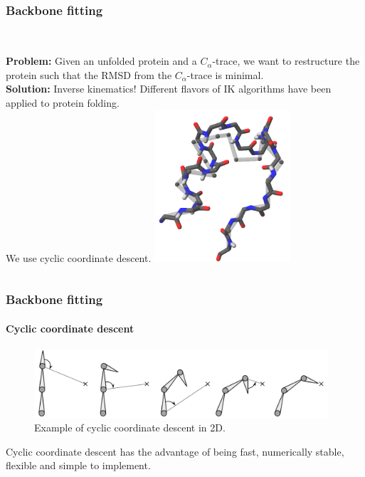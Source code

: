 \documentclass{beamer}
\begin{document}
\subsection*{}
\begin{frame}[t, fragile]
  \frametitle{Backbone fitting} 
\begin{columns}[c]
\column{2.3in}
\\\vspace*{4mm}
\textbf{Problem:} Given an unfolded protein and a $C_\alpha$-trace, we want to restructure the protein such that the RMSD from the $C_\alpha$-trace is minimal.
\\\vspace*{4mm}
\textbf{Solution:} Inverse kinematics! Different flavors of IK algorithms have been applied to protein folding.
\\\vspace*{8mm}
We use cyclic coordinate descent.
\column{2in}
	\vspace*{4mm}
	\includegraphics[width=2in]{../rapport/figures/forside.png}
\end{columns}
\end{frame}

\begin{frame}[t, fragile]
\frametitle{Backbone fitting} 
\framesubtitle{Cyclic coordinate descent}
\begin{figure}
	\centering
	\includegraphics[width=4.3in]{ccd2d}
	\caption{Example of cyclic coordinate descent in 2D.}
\end{figure}
\vspace*{2mm}
Cyclic coordinate descent has the advantage of being fast, numerically stable, flexible and simple to implement.
\end{frame}
\end{document}
